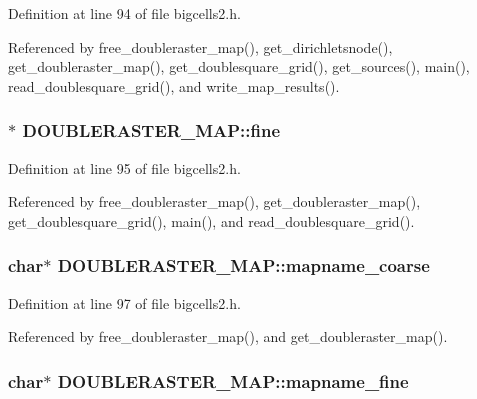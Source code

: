 Definition at line 94 of file bigcells2.\-h.



Referenced by free\-\_\-doubleraster\-\_\-map(), get\-\_\-dirichletsnode(), get\-\_\-doubleraster\-\_\-map(), get\-\_\-doublesquare\-\_\-grid(), get\-\_\-sources(), main(), read\-\_\-doublesquare\-\_\-grid(), and write\-\_\-map\-\_\-results().

\hypertarget{struct_d_o_u_b_l_e_r_a_s_t_e_r___m_a_p_a364a36b22a25bd279a05850e4397357f}{
\subsubsection[{fine}]{$\ast$ D\-O\-U\-B\-L\-E\-R\-A\-S\-T\-E\-R\-\_\-\-M\-A\-P\-::fine}}\label{struct_d_o_u_b_l_e_r_a_s_t_e_r___m_a_p_a364a36b22a25bd279a05850e4397357f}


Definition at line 95 of file bigcells2.\-h.



Referenced by free\-\_\-doubleraster\-\_\-map(), get\-\_\-doubleraster\-\_\-map(), get\-\_\-doublesquare\-\_\-grid(), main(), and read\-\_\-doublesquare\-\_\-grid().

\hypertarget{struct_d_o_u_b_l_e_r_a_s_t_e_r___m_a_p_a477e487196760961126756e6ddec6703}{
\subsubsection[{mapname\-\_\-coarse}]{\setlength{\rightskip}{0pt plus 5cm}char$\ast$ D\-O\-U\-B\-L\-E\-R\-A\-S\-T\-E\-R\-\_\-\-M\-A\-P\-::mapname\-\_\-coarse}}\label{struct_d_o_u_b_l_e_r_a_s_t_e_r___m_a_p_a477e487196760961126756e6ddec6703}


Definition at line 97 of file bigcells2.\-h.



Referenced by free\-\_\-doubleraster\-\_\-map(), and get\-\_\-doubleraster\-\_\-map().

\hypertarget{struct_d_o_u_b_l_e_r_a_s_t_e_r___m_a_p_a9c99160b7734de521e28acf8607dc24c}{
\subsubsection[{mapname\-\_\-fine}]{\setlength{\rightskip}{0pt plus 5cm}char$\ast$ D\-O\-U\-B\-L\-E\-R\-A\-S\-T\-E\-R\-\_\-\-M\-A\-P\-::mapname\-\_\-fine}}\label{struct_d_o_u_b_l_e_r_a_s_t_e_r___m_a_p_a9c99160b7734de521e28acf8607dc24c}


